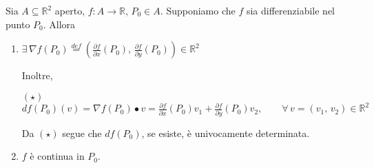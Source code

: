 \begin{thm}
Sia $A \subseteq \mathbb{R}^2$ aperto, $f:A \longrightarrow \mathbb{R}$, $P_0 \in A$. Supponiamo che $f$ sia differenziabile nel punto $P_0$. Allora
\begin{enumerate}[labelindent=\parindent,leftmargin=*,label=\textnormal{(\roman*)},start=1]
\item $\displaystyle \exists \, \nabla f(P_0) \overset{def}{=} \left( \frac{\partial f}{\partial x}(P_0), \, \frac{\partial f}{\partial y}(P_0) \right) \in \mathbb{R}^2$

Inoltre,
\begin{center}
$\mathrm{(\star)}$
\hfill
$\displaystyle
df(P_0)(v) = \nabla f(P_0) \bullet v = \frac{\partial f}{\partial x}(P_0)v_1 + \frac{\partial f}{\partial y}(P_0)v_2, \qquad \forall \, v=(v_1,\,v_2) \in \mathbb{R}^2$
\hfill \null
\end{center}
Da $(\star)$ segue che $df(P_0)$, se esiste, è univocamente determinata.

\item $f$ è continua in $P_0$.
\end{enumerate}

\end{thm}
